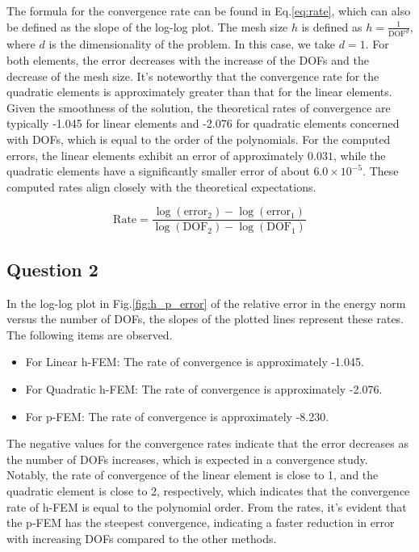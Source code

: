 \documentclass[twoside,twocolumn,10pt]{article}
\begin{document}
The formula for the convergence rate can be found in Eq.\ref{eq:rate}, which can also be defined as the slope of the log-log plot. The mesh size \( h \) is defined as \( h = \frac{1}{{\text{DOF}}^d} \), where \( d \) is the dimensionality of the problem. In this case, we take \( d = 1 \). For both elements, the error decreases with the increase of the DOFs and the decrease of the mesh size. It's noteworthy that the convergence rate for the quadratic elements is approximately greater than that for the linear elements. Given the smoothness of the solution, the theoretical rates of convergence are typically -1.045 for linear elements and -2.076 for quadratic elements concerned with DOFs, which is equal to the order of the polynomials. For the computed errors, the linear elements exhibit an error of approximately \(0.031\), while the quadratic elements have a significantly smaller error of about \(6.0 \times 10^{-5}\). These computed rates align closely with the theoretical expectations.

\begin{equation}
\text{Rate} = \frac{\log(\text{error}_2) - \log(\text{error}_1)}{\log(\text{DOF}_2) - \log(\text{DOF}_1)}
\label{eq:rate}
\end{equation}

\subsection{Question 2}
In the log-log plot in Fig.\ref{fig:h_p_error} of the relative error in the energy norm versus the number of DOFs, the slopes of the plotted lines represent these rates. The following items are observed.

\begin{itemize}
    \item For Linear h-FEM: The rate of convergence is approximately -1.045.
    \item For Quadratic h-FEM: The rate of convergence is approximately -2.076.
    \item For p-FEM: The rate of convergence is approximately -8.230.
\end{itemize}
The negative values for the convergence rates indicate that the error decreases as the number of DOFs increases, which is expected in a convergence study. Notably, the rate of convergence of the linear element is close to 1, and the quadratic element is close to 2, respectively, which indicates that the convergence rate of h-FEM is equal to the polynomial order. From the rates, it's evident that the p-FEM has the steepest convergence, indicating a faster reduction in error with increasing DOFs compared to the other methods. 
\end{document}
